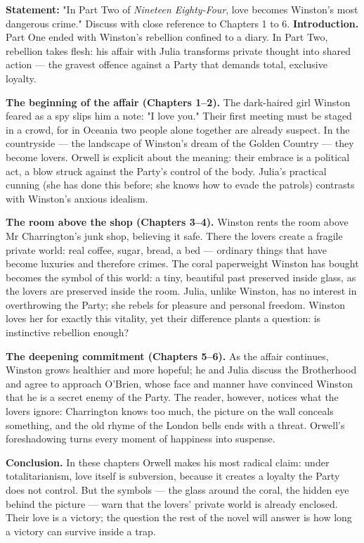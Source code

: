\documentclass[11pt]{article}
\begin{document}
\begin{exoresolu}
\textbf{Statement:} "In Part Two of \emph{Nineteen Eighty-Four}, love becomes Winston's most dangerous crime." Discuss with close reference to Chapters 1 to 6.
\tcblower
\textbf{Introduction.} Part One ended with Winston's rebellion confined to a diary. In Part Two, rebellion takes flesh: his affair with Julia transforms private thought into shared action — the gravest offence against a Party that demands total, exclusive loyalty.

\textbf{The beginning of the affair (Chapters 1--2).} The dark-haired girl Winston feared as a spy slips him a note: "I love you." Their first meeting must be staged in a crowd, for in Oceania two people alone together are already suspect. In the countryside — the landscape of Winston's dream of the Golden Country — they become lovers. Orwell is explicit about the meaning: their embrace is a political act, a blow struck against the Party's control of the body. Julia's practical cunning (she has done this before; she knows how to evade the patrols) contrasts with Winston's anxious idealism.

\textbf{The room above the shop (Chapters 3--4).} Winston rents the room above Mr Charrington's junk shop, believing it safe. There the lovers create a fragile private world: real coffee, sugar, bread, a bed — ordinary things that have become luxuries and therefore crimes. The coral paperweight Winston has bought becomes the symbol of this world: a tiny, beautiful past preserved inside glass, as the lovers are preserved inside the room. Julia, unlike Winston, has no interest in overthrowing the Party; she rebels for pleasure and personal freedom. Winston loves her for exactly this vitality, yet their difference plants a question: is instinctive rebellion enough?

\textbf{The deepening commitment (Chapters 5--6).} As the affair continues, Winston grows healthier and more hopeful; he and Julia discuss the Brotherhood and agree to approach O'Brien, whose face and manner have convinced Winston that he is a secret enemy of the Party. The reader, however, notices what the lovers ignore: Charrington knows too much, the picture on the wall conceals something, and the old rhyme of the London bells ends with a threat. Orwell's foreshadowing turns every moment of happiness into suspense.

\textbf{Conclusion.} In these chapters Orwell makes his most radical claim: under totalitarianism, love itself is subversion, because it creates a loyalty the Party does not control. But the symbols — the glass around the coral, the hidden eye behind the picture — warn that the lovers' private world is already enclosed. Their love is a victory; the question the rest of the novel will answer is how long a victory can survive inside a trap.
\end{exoresolu}
\end{document}
